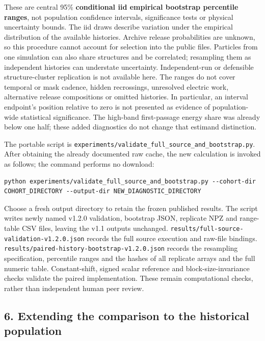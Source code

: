 These are central 95\% \textbf{conditional iid empirical bootstrap
percentile ranges}, not population confidence intervals, significance
tests or physical uncertainty bounds. The iid draws describe variation
under the empirical distribution of the available histories. Archive
release probabilities are unknown, so this procedure cannot account for
selection into the public files. Particles from one simulation can also
share structures and be correlated; resampling them as independent
histories can understate uncertainty. Independent-run or defensible
structure-cluster replication is not available here. The ranges do not
cover temporal or mask cadence, hidden recrossings, unresolved electric
work, alternative release compositions or omitted histories. In
particular, an interval endpoint's position relative to zero is not
presented as evidence of population-wide statistical significance. The
high-band first-passage energy share was already below one half; these
added diagnostics do not change that estimand distinction.

The portable script is
\nolinkurl{experiments/validate_full_source_and_bootstrap.py}. After
obtaining the already documented raw cache, the new calculation is
invoked as follows; the command performs no download:

\begin{lstlisting}[numbers=none]
python experiments/validate_full_source_and_bootstrap.py --cohort-dir COHORT_DIRECTORY --output-dir NEW_DIAGNOSTIC_DIRECTORY
\end{lstlisting}

Choose a fresh output directory to retain the frozen published results.
The script writes newly named v1.2.0 validation, bootstrap JSON,
replicate NPZ and range-table CSV files, leaving the v1.1 outputs
unchanged. \nolinkurl{results/full-source-validation-v1.2.0.json} records
the full source execution and raw-file bindings.
\nolinkurl{results/paired-history-bootstrap-v1.2.0.json} records the
resampling specification, percentile ranges and the hashes of all
replicate arrays and the full numeric table. Constant-shift, signed
scalar reference and block-size-invariance checks validate the paired
implementation. These remain computational checks, rather than
independent human peer review.

\FloatBarrier
\subsection{6. Extending the comparison to the historical
population}\label{extending-the-comparison-to-the-historical-population}

